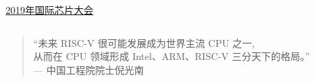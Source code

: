 \begin{frame}{}
\end{frame}

\begin{frame}{}
  \begin{center}
    \href{https://www.benchcouncil.org/conferences/ficc/2019/chips19/chips19.html}{2019年国际芯片大会}
  \end{center}
  \begin{columns}
  \end{columns}

  \begin{quote}
    ``未来 RISC-V 很可能发展成为世界主流 CPU 之一, \\[5pt]
    从而在 CPU 领域形成 Intel、ARM、RISC-V 三分天下的格局。'' \\[5pt]
    \hfill --- 中国工程院院士\quad 倪光南
  \end{quote}
\end{frame}
